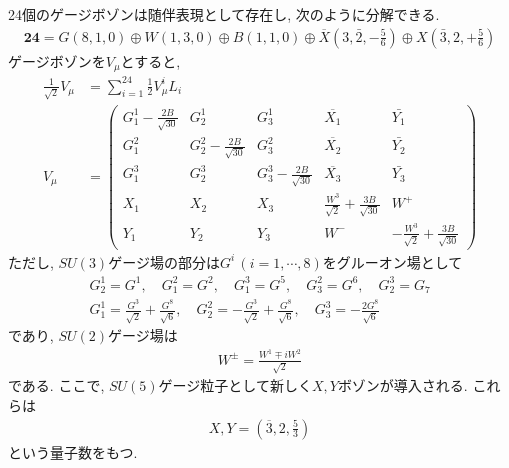 24個のゲージボゾンは随伴表現として存在し, 次のように分解できる.
\begin{align}
  \bm{24} = G(8,1,0)\oplus W(1,3,0)\oplus B(1,1,0)\oplus \overline{X}(3,\bar{2},-\frac{5}{6})\oplus X(\bar{3},2,+\frac{5}{6})
\end{align}
ゲージボゾンを$V_\mu$とすると,
\begin{align}
  \frac{1}{\sqrt{2}}V_\mu &= \sum_{i=1}^{24}\frac{1}{2}V_\mu^i L_i\\
  V_\mu &= \left(\begin{array}{ccccc}
    G^1_1 - \frac{2B}{\sqrt{30}} & G^1_2 & G^1_3 & \overline{X_1} & \bar{Y_1} \\
    G^2_1 & G^2_2 - \frac{2B}{\sqrt{30}} & G^2_3 & \overline{X_2} & \bar{Y_2} \\
    G^3_1 & G^3_2 & G^3_3 - \frac{2B}{\sqrt{30}} & \overline{X_3} & \bar{Y_3} \\
    X_1   & X_2 & X_3 & \frac{W^3}{\sqrt{2}} + \frac{3B}{\sqrt{30}} & W^+ \\
    Y_1   & Y_2 & Y_3 & W^- &    -\frac{W^3}{\sqrt{2}} + \frac{3B}{\sqrt{30}} 
      \end{array}
  \right)
\end{align}
ただし, $SU(3)$ゲージ場の部分は$G^i\,(i=1,\cdots,8)$をグルーオン場として
\begin{align}
  G^1_2 = G^1,\quad G^2_1 = G^2,\quad G^3_1 = G^5,\quad G^2_3 = G^6,\quad G^3_2 = G_7\nonumber\\
  G^1_1 = \frac{G^3}{\sqrt{2}} + \frac{G^8}{\sqrt{6}},\quad G^2_2=-\frac{G^3}{\sqrt{2}}+\frac{G^8}{\sqrt{6}},\quad G^3_3 = -\frac{2G^8}{\sqrt{6}}\nonumber
\end{align}
であり, $SU(2)$ゲージ場は
\begin{align}
  W^\pm = \frac{W^1\mp iW^2}{\sqrt{2}}\nonumber
\end{align}
である.
ここで, $SU(5)$ゲージ粒子として新しく$X, Y$ボゾンが導入される.
これらは
\begin{align}
  X, Y = \left(\overline{3},2, \frac{5}{3}\right)\label{XY_bosons}
\end{align}
という量子数をもつ.

